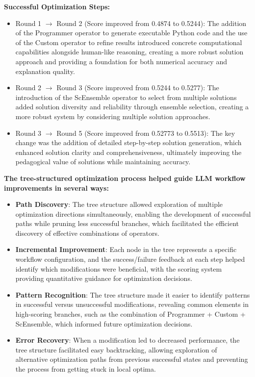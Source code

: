\documentclass{article} %
\theoremstyle{plain}
\theoremstyle{definition}
\theoremstyle{remark}
\begin{document}
\textbf{Successful Optimization Steps:}
\begin{itemize}[leftmargin=20pt]
    \item Round 1 $\rightarrow$ Round 2 (Score improved from 0.4874 to 0.5244): The addition of the Programmer operator to generate executable Python code and the use of the Custom operator to refine results introduced concrete computational capabilities alongside human-like reasoning, creating a more robust solution approach and providing a foundation for both numerical accuracy and explanation quality.
    
    \item Round 2 $\rightarrow$ Round 3 (Score improved from 0.5244 to 0.5277): The introduction of the ScEnsemble operator to select from multiple solutions added solution diversity and reliability through ensemble selection, creating a more robust system by considering multiple solution approaches.
    
    \item Round 3 $\rightarrow$ Round 5 (Score improved from 0.52773 to 0.5513): The key change was the addition of detailed step-by-step solution generation, which enhanced solution clarity and comprehensiveness, ultimately improving the pedagogical value of solutions while maintaining accuracy.
\end{itemize}

\textbf{The tree-structured optimization process helped guide LLM workflow improvements in several ways:}
\begin{itemize}[leftmargin=20pt]
    \item \textbf{Path Discovery}: The tree structure allowed exploration of multiple optimization directions simultaneously, enabling the development of successful paths while pruning less successful branches, which facilitated the efficient discovery of effective combinations of operators.
    
    \item \textbf{Incremental Improvement}: Each node in the tree represents a specific workflow configuration, and the success/failure feedback at each step helped identify which modifications were beneficial, with the scoring system providing quantitative guidance for optimization decisions.
    
    \item \textbf{Pattern Recognition}: The tree structure made it easier to identify patterns in successful versus unsuccessful modifications, revealing common elements in high-scoring branches, such as the combination of Programmer + Custom + ScEnsemble, which informed future optimization decisions.
    
    \item \textbf{Error Recovery}: When a modification led to decreased performance, the tree structure facilitated easy backtracking, allowing exploration of alternative optimization paths from previous successful states and preventing the process from getting stuck in local optima.
\end{itemize}
\end{document}
